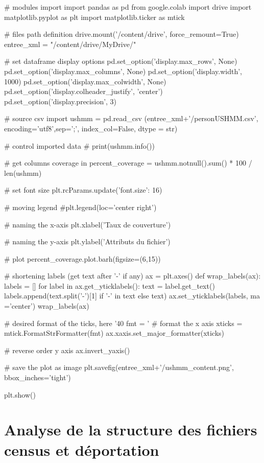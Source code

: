 \documentclass[a4paper,12pt,twoside]{book}
\begin{document}
		    \begin{python}
# modules import
import pandas as pd
from google.colab import drive
import matplotlib.pyplot as plt
import matplotlib.ticker as mtick

# files path definition
drive.mount('/content/drive', force_remount=True)
entree_xml = "/content/drive/MyDrive/"

# set dataframe display options
pd.set_option('display.max_rows', None)
pd.set_option('display.max_columns', None)
pd.set_option('display.width', 1000)
pd.set_option('display.max_colwidth', None)
pd.set_option('display.colheader_justify', 'center')
pd.set_option('display.precision', 3)

# source csv import
ushmm = pd.read_csv (entree_xml+'/personUSHMM.csv', encoding='utf8',sep=';', index_col=False, dtype = str)

# control imported data
# print(ushmm.info())

# get columns coverage in %
percent_coverage = ushmm.notnull().sum() * 100 / len(ushmm)

# set font size
plt.rcParams.update({'font.size': 16})

# moving legend
#plt.legend(loc='center right')

# naming the x-axis
plt.xlabel('Taux de couverture')

# naming the y-axis
plt.ylabel('Attributs du fichier')

# plot %
percent_coverage.plot.barh(figsize=(6,15))

# shortening labels (get text after '-' if any)
ax = plt.axes()
def wrap_labels(ax):
    labels = []
    for label in ax.get_yticklabels():
        text = label.get_text()
        labels.append(text.split('-')[1] if '-' in text else text)
    ax.set_yticklabels(labels, ma ='center')
wrap_labels(ax)

# desired format of the ticks, here '40%
fmt = '%
# format the x axis
xticks = mtick.FormatStrFormatter(fmt)
ax.xaxis.set_major_formatter(xticks)

# reverse order y axis
ax.invert_yaxis()

# save the plot as image
plt.savefig(entree_xml+'/ushmm_content.png', bbox_inches='tight')

plt.show()		    
		    \end{python}

        \section{Analyse de la structure des fichiers census et déportation}
        
\end{document}
